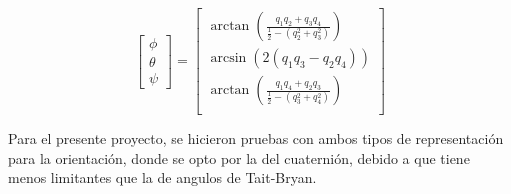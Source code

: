     \begin{equation}
        \begin{bmatrix}
            \phi \\ \theta \\ \psi 
        \end{bmatrix} =
            \begin{bmatrix}
                \arctan \left (\frac{q_1q_2 + q_3q_4}{\frac{1}{2}-(q^2_2+q^2_3)} \right ) \\
                \arcsin  (2(q_1q_3-q_2q_4)) \\
                \arctan \left (\frac{q_1q_4 + q_2q_3}{\frac{1}{2}-(q^2_3+q^2_4)} \right ) \\
            \end{bmatrix}
    \end{equation}

    Para el presente proyecto, se hicieron pruebas con ambos tipos de representación para la orientación, 
    donde se opto por la del cuaternión, debido a que tiene menos limitantes que la de angulos de Tait-Bryan.

